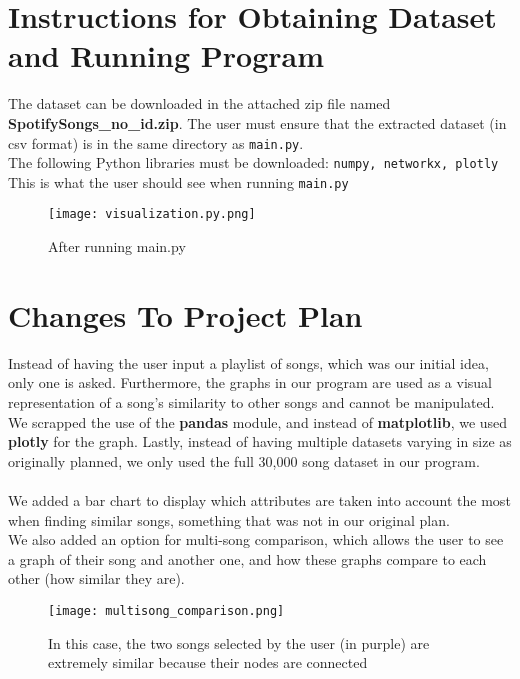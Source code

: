\documentclass[fontsize=11pt]{article}
\begin{document}
\section*{Instructions for Obtaining Dataset and Running Program}
The dataset can be downloaded in the attached zip file named \textbf{SpotifySongs\_no\_id.zip}. The user must ensure that the extracted dataset (in csv format) is in the same directory as \texttt{main.py}.\\
The following Python libraries must be downloaded: \texttt{numpy, networkx, plotly}\\
This is what the user should see when running \texttt{main.py}\\
\begin{figure}[h!]
    \centering
    \texttt{[image: visualization.py.png]}
    \caption{After running main.py}
    \label{fig:enter-label}
\end{figure}

\section*{Changes To Project Plan}
Instead of having the user input a playlist of songs, which was our initial idea, only one is asked. Furthermore, the graphs in our program are used as a visual representation of a song's similarity to other songs and cannot be manipulated. We scrapped the use of the \textbf{pandas} module, and instead of \textbf{matplotlib}, we used \textbf{plotly} for the graph. Lastly, instead of having multiple datasets varying in size as originally planned, we only used the full 30,000 song dataset in our program.\\
\\
We added a bar chart to display which attributes are taken into account the most when finding similar songs, something that was not in our original plan.\\
We also added an option for multi-song comparison, which allows the user to see a graph of their song and another one, and how these graphs compare to each other (how similar they are). 
\begin{figure}[h!]
    \centering
    \texttt{[image: multisong\_comparison.png]}
    \caption{In this case, the two songs selected by the user (in purple) are extremely similar because their nodes are connected}
    \label{fig:enter-label}
\end{figure}
\end{document}
